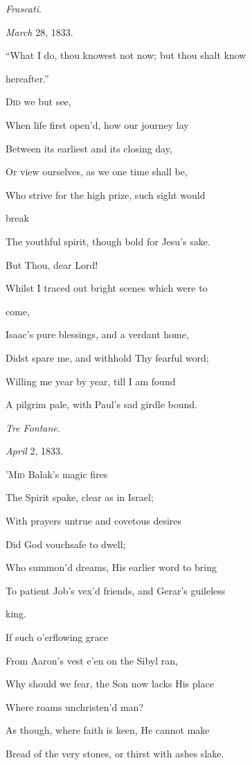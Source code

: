\emph{Frascati}.

\emph{March} 28, 1833.


``What I do, thou knowest not now; but thou
shalt know

hereafter.''

D\textsc{id} we but see,

When life first open'd, how our journey lay

Between its earliest and its closing day,

Or view ourselves, as we one time shall be,

Who strive for the high prize, such sight would

break

The youthful spirit, though bold for Jesu's sake.

But Thou, dear Lord!

Whilst I traced out bright scenes which were to

come,

Isaac's pure blessings, and a verdant home,

Didst spare me, and withhold Thy fearful
word;

Willing me year by year, till I am found

A pilgrim pale, with Paul's sad girdle bound.

\emph{Tre Fontane}.

\emph{April} 2, 1833.


'M\textsc{id} Balak's magic fires

The Spirit spake, clear as in Israel;

With prayers untrue and covetous desires

Did God vouchsafe to
dwell;

Who summon'd dreams, His earlier word to bring

To patient Job's vex'd friends, and Gerar's guileless

king.

If such o'erflowing grace

From Aaron's vest e'en on the Sibyl ran,

Why should we fear, the Son now lacks His place

Where roams unchristen'd
man?

As though, where faith is keen, He cannot make

Bread of the very stones, or thirst with ashes slake.

